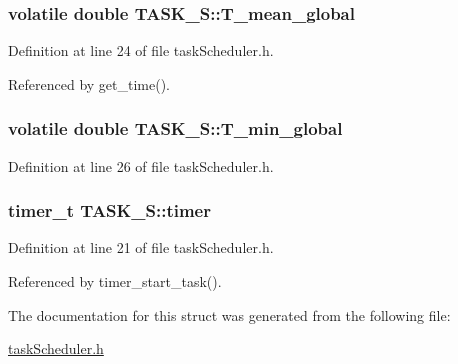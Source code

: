 \hypertarget{structTASK__S_a9ebae87e1b64869f328a47473f2ea7d7}{
\subsubsection[{T\-\_\-mean\-\_\-global}]{\setlength{\rightskip}{0pt plus 5cm}volatile double T\-A\-S\-K\-\_\-\-S\-::\-T\-\_\-mean\-\_\-global}}\label{structTASK__S_a9ebae87e1b64869f328a47473f2ea7d7}


Definition at line 24 of file task\-Scheduler.\-h.



Referenced by get\-\_\-time().

\hypertarget{structTASK__S_a07174e333a0013f4d51b30509b388f58}{
\subsubsection[{T\-\_\-min\-\_\-global}]{\setlength{\rightskip}{0pt plus 5cm}volatile double T\-A\-S\-K\-\_\-\-S\-::\-T\-\_\-min\-\_\-global}}\label{structTASK__S_a07174e333a0013f4d51b30509b388f58}


Definition at line 26 of file task\-Scheduler.\-h.

\hypertarget{structTASK__S_a17834f3d4f84241ccb4191f3cf7d7af3}{
\subsubsection[{timer}]{\setlength{\rightskip}{0pt plus 5cm}timer\-\_\-t T\-A\-S\-K\-\_\-\-S\-::timer}}\label{structTASK__S_a17834f3d4f84241ccb4191f3cf7d7af3}


Definition at line 21 of file task\-Scheduler.\-h.



Referenced by timer\-\_\-start\-\_\-task().



The documentation for this struct was generated from the following file\-:\begin{DoxyCompactItemize}
\item 
\hyperlink{taskScheduler_8h}{task\-Scheduler.\-h}\end{DoxyCompactItemize}
